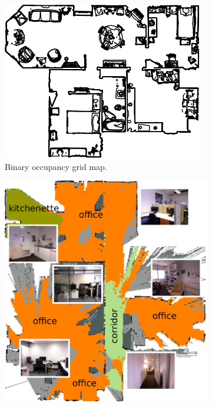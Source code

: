  \begin{figure}[h!]
 	\centering
 	\begin{subfigure}[b]{0.45\linewidth}
 		\centering
 		\includegraphics[width=\textwidth]{images/occupancygrid.png}
 		\caption{Binary occupancy grid map.}
 		\label{fig:binary_grid_map}
 	\end{subfigure}
 	\hfill
 	\begin{subfigure}[b]{0.48\linewidth}
 		\centering
 		\includegraphics[width=\textwidth]{images/semanticmap.png}

\end{subfigure}
\end{figure}
